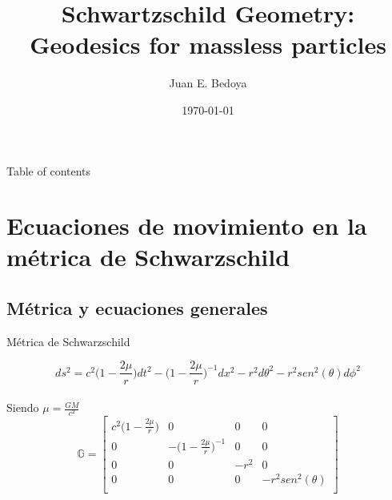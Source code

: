\documentclass[xcolor=dvipsnames]{beamer}
\title[Schwartzschild geometry]{Schwartzschild Geometry: Geodesics for massless particles}
\date{\today}
\author[Universidad del Valle]{ Juan E. Bedoya }
\institute[]{Universidad del Valle \\ Departamento de física}
\begin{document}
	
	\begin{frame}
		\titlepage
	\end{frame}
	
	\begin{frame}{Table of contents}
    \tableofcontents
	\end{frame}
	
	
	
	\section{Ecuaciones de movimiento en la métrica de Schwarzschild}
	\subsection{Métrica y ecuaciones generales}
	\begin{frame}{Métrica de Schwarzschild}
	    
	    \begin{block}{}
	   
	    \begin{equation*}
	    ds^{2}=c^{2}\Big( 1- \frac{2\mu}{r}\Big) dt^{2}-\Big( 1- \frac{2\mu}{r}\Big)^{-1} dx^{2}-r^{2}d\theta^{2}-r^{2}sen^{2}(\theta)d\phi^{2} 
	    \end{equation*}\\
	   Siendo $\mu=\frac{GM}{c^{2}}$
	\begin{equation*}
	\mathbb{G}=
     \begin{bmatrix}
      c^{2}\Big( 1- \frac{2\mu}{r}\Big) & 0&0&0\\
      0 &-\Big( 1- \frac{2\mu}{r}\Big)^{-1}&0&0\\
      0&0&-r^{2}&0\\
      0&0&0&-r^{2} sen^{2}(\theta)\\
\end{bmatrix}
\end{equation*}

  \end{block}

	\end{frame}
	
\end{document}
